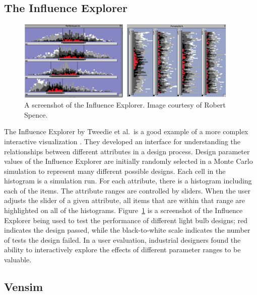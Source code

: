 \subsection{The Influence Explorer}

\begin{figure}[h]
	\centering
	\includegraphics[width=0.95\textwidth]{figures/png/influenceExplorer3.png}
	\caption[A screenshot of the Influence Explorer]{A screenshot of the Influence Explorer.  Image courtesy of Robert Spence.}
	\label{fig:influenceExplorer}
\end{figure}

The Influence Explorer by Tweedie et al.\ is a good example of a more complex interactive visualization \citeyearpar{tweedie1995}.  They developed an interface for understanding the relationships between different attributes in a design process.  Design parameter values of the Influence Explorer are initially randomly selected in a Monte Carlo simulation to represent many different possible designs.  Each cell in the histogram is a simulation run.  For each attribute, there is a histogram including each of the items.  The attribute ranges are controlled by sliders.  When the user adjusts the slider of a given attribute, all items that are within that range are highlighted on all of the histograms.  Figure~\ref{fig:influenceExplorer} is a screenshot of the Influence Explorer being used to test the performance of different light bulb designs; red indicates the design passed, while the black-to-white scale indicates the number of tests the design failed.  In a user evaluation, industrial designers found the ability to interactively explore the effects of different parameter ranges to be valuable.

\subsection{Vensim}

